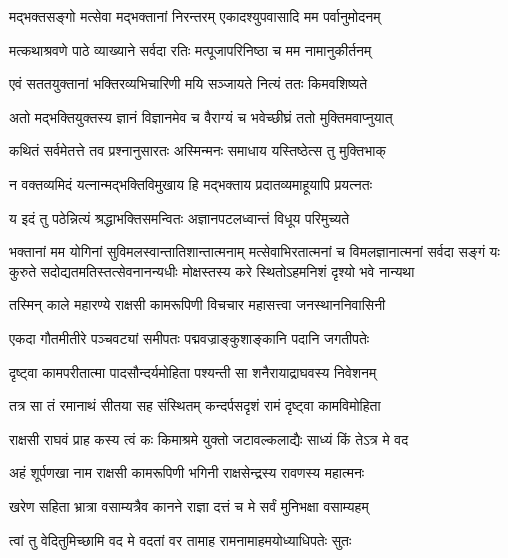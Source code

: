 \twolineshloka
{मद्भक्तसङ्गो मत्सेवा मद्भक्तानां निरन्तरम्}
{एकादश्युपवासादि मम पर्वानुमोदनम्} %

\twolineshloka
{मत्कथाश्रवणे पाठे व्याख्याने सर्वदा रतिः}
{मत्पूजापरिनिष्ठा च मम नामानुकीर्तनम्} %

\twolineshloka
{एवं सततयुक्तानां भक्तिरव्यभिचारिणी}
{मयि सञ्जायते नित्यं ततः किमवशिष्यते} %

\twolineshloka
{अतो मद्भक्तियुक्तस्य ज्ञानं विज्ञानमेव च}
{वैराग्यं च भवेच्छीघ्रं ततो मुक्तिमवाप्नुयात्} %

\twolineshloka
{कथितं सर्वमेतत्ते तव प्रश्नानुसारतः}
{अस्मिन्मनः समाधाय यस्तिष्ठेत्स तु मुक्तिभाक्} %

\twolineshloka
{न वक्तव्यमिदं यत्नान्मद्भक्तिविमुखाय हि}
{मद्भक्ताय प्रदातव्यमाहूयापि प्रयत्नतः} %

\twolineshloka
{य इदं तु पठेन्नित्यं श्रद्धाभक्तिसमन्वितः}
{अज्ञानपटलध्वान्तं विधूय परिमुच्यते} %

\fourlineindentedshloka
{भक्तानां मम योगिनां सुविमलस्वान्तातिशान्तात्मनाम्}
{मत्सेवाभिरतात्मनां च विमलज्ञानात्मनां सर्वदा}
{सङ्गं यः कुरुते सदोद्यतमतिस्तत्सेवनानन्यधीः}
{मोक्षस्तस्य करे स्थितोऽहमनिशं दृश्यो भवे नान्यथा} %






\twolineshloka
{तस्मिन् काले महारण्ये राक्षसी कामरूपिणी}
{विचचार महासत्त्वा जनस्थाननिवासिनी} %

\twolineshloka
{एकदा गौतमीतीरे पञ्चवट्यां समीपतः}
{पद्मवज्राङ्कुशाङ्कानि पदानि जगतीपतेः} %

\twolineshloka
{दृष्ट्वा कामपरीतात्मा पादसौन्दर्यमोहिता}
{पश्यन्ती सा शनैरायाद्राघवस्य निवेशनम्} %

\twolineshloka
{तत्र सा तं रमानाथं सीतया सह संस्थितम्}
{कन्दर्पसदृशं रामं दृष्ट्वा कामविमोहिता} %

\twolineshloka
{राक्षसी राघवं प्राह कस्य त्वं कः किमाश्रमे}
{युक्तो जटावल्कलाद्यैः साध्यं किं तेऽत्र मे वद} %

\twolineshloka
{अहं शूर्पणखा नाम राक्षसी कामरूपिणी}
{भगिनी राक्षसेन्द्रस्य रावणस्य महात्मनः} %

\twolineshloka
{खरेण सहिता भ्रात्रा वसाम्यत्रैव कानने}
{राज्ञा दत्तं च मे सर्वं मुनिभक्षा वसाम्यहम्} %

\twolineshloka
{त्वां तु वेदितुमिच्छामि वद मे वदतां वर}
{तामाह रामनामाहमयोध्याधिपतेः सुतः} %


